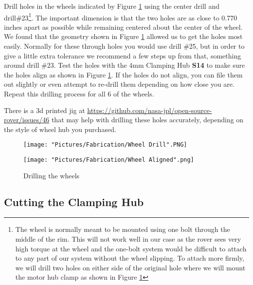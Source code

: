 \documentclass[12pt]{article}
\begin{document}
Drill holes in the wheels indicated by Figure \ref{Wheel drill} using the center drill and drill\#23\footnote{The wheel is normally meant to be mounted using one bolt through the middle of the rim. This will not work well in our case as the rover sees very high torque at the wheel and the one-bolt system would be difficult to attach to any part of our system without the wheel slipping. To attach more firmly, we will drill two holes on either side of the original hole where we will mount the motor hub clamp as shown in Figure \ref{Wheel drill}}. The important dimension is that the two holes are as close to 0.770 inches apart as possible while remaining centered about the center of the wheel. We found that the geometry shown in Figure \ref{Wheel drill} allowed us to get the holes most easily. Normally for these through holes you would use drill \#25, but in order to give a little extra tolerance we recommend a few steps up from that, something around drill \#23. Test the holes with the 4mm Clamping Hub \textbf{S14} to make sure the holes align as shown in Figure \ref{Wheel drill}. If the holes do not align, you can file them out slightly or even attempt to re-drill them depending on how close you are. Repeat this drilling process for all 6 of the wheels.

There is a 3d printed jig at \href{https://github.com/nasa-jpl/open-source-rover/issues/46}{https://github.com/nasa-jpl/open-source-rover/issues/46} that may help with drilling these holes accurately, depending on the style of wheel hub you purchased.




\begin{figure}[H]
  \centering
  \begin{minipage}[b]{0.45\textwidth}
    \texttt{[image: "Pictures/Fabrication/Wheel Drill".PNG]}
  \end{minipage}
  \hfill
  \begin{minipage}[b]{0.45\textwidth}
    \texttt{[image: "Pictures/Fabrication/Wheel Aligned".png]}
  \end{minipage}
  \caption{Drilling the wheels}
  \label{Wheel drill}
\end{figure}


\subsection{Cutting the Clamping Hub}
\end{document}
